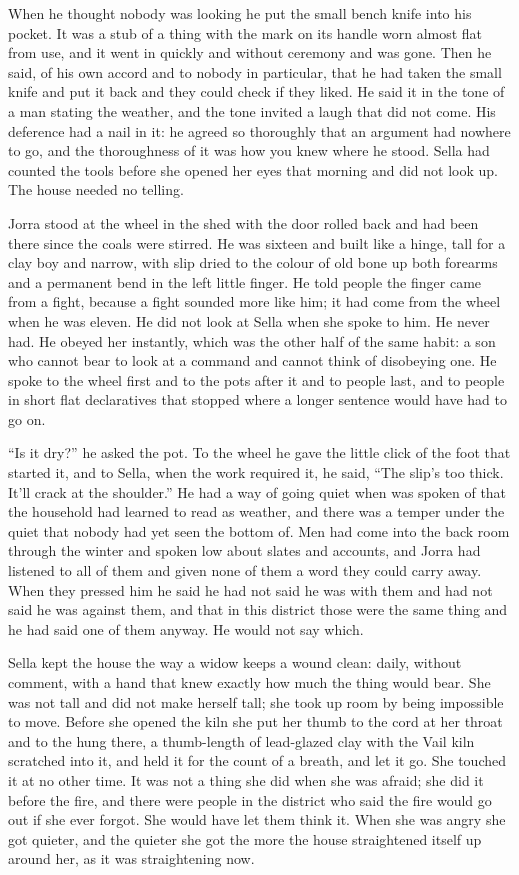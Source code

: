 When he thought nobody was looking he put the small bench knife into his pocket. It was a stub of a thing with the mark on its handle worn almost flat from use, and it went in quickly and without ceremony and was gone. Then he said, of his own accord and to nobody in particular, that he had taken the small knife and put it back and they could check if they liked. He said it in the tone of a man stating the weather, and the tone invited a laugh that did not come. His deference had a nail in it: he agreed so thoroughly that an argument had nowhere to go, and the thoroughness of it was how you knew where he stood. Sella had counted the tools before she opened her eyes that morning and did not look up. The house needed no telling.

Jorra stood at the wheel in the shed with the door rolled back and had been there since the coals were stirred. He was sixteen and built like a hinge, tall for a clay boy and narrow, with slip dried to the colour of old bone up both forearms and a permanent bend in the left little finger. He told people the finger came from a fight, because a fight sounded more like him; it had come from the wheel when he was eleven. He did not look at Sella when she spoke to him. He never had. He obeyed her instantly, which was the other half of the same habit: a son who cannot bear to look at a command and cannot think of disobeying one. He spoke to the wheel first and to the pots after it and to people last, and to people in short flat declaratives that stopped where a longer sentence would have had to go on.

“Is it dry?” he asked the pot. To the wheel he gave the little click of the foot that started it, and to Sella, when the work required it, he said, “The slip's too thick. It'll crack at the shoulder.” He had a way of going quiet when  was spoken of that the household had learned to read as weather, and there was a temper under the quiet that nobody had yet seen the bottom of. Men had come into the back room through the winter and spoken low about slates and accounts, and Jorra had listened to all of them and given none of them a word they could carry away. When they pressed him he said he had not said he was with them and had not said he was against them, and that in this district those were the same thing and he had said one of them anyway. He would not say which.

Sella kept the house the way a widow keeps a wound clean: daily, without comment, with a hand that knew exactly how much the thing would bear. She was not tall and did not make herself tall; she took up room by being impossible to move. Before she opened the kiln she put her thumb to the cord at her throat and to the  hung there, a thumb-length of lead-glazed clay with the Vail kiln scratched into it, and held it for the count of a breath, and let it go. She touched it at no other time. It was not a thing she did when she was afraid; she did it before the fire, and there were people in the district who said the fire would go out if she ever forgot. She would have let them think it. When she was angry she got quieter, and the quieter she got the more the house straightened itself up around her, as it was straightening now.

